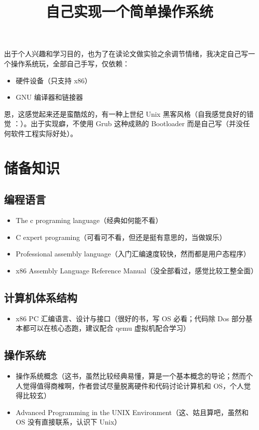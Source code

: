 

\title{自己实现一个简单操作系统}	
\maketitle

出于个人兴趣和学习目的，也为了在读论文做实验之余调节情绪，我决定自己写一个操作系统玩，全部自己手写，仅依赖：
\begin{itemize}
	\item 硬件设备（只支持 x86）
	\item GNU 编译器和链接器
\end{itemize}

恩，这感觉起来还是蛮酷炫的，有一种上世纪 Unix 黑客风格（自我感觉良好的错觉 ：）。出于实现癖，不使用 Grub 这种成熟的 Bootloader 而是自己写（并没任何软件工程实际好处）。

\section{储备知识}

\subsection{编程语言}
\begin{itemize}
	\item The c programing language（经典如何能不看）
	\item C expert programing（可看可不看，但还是挺有意思的，当做娱乐）
	\item Professional assembly language（入门汇编速度较快，然而都是用户态程序）
	\item x86 Assembly Language Reference Manual（没全部看过，感觉比较工整全面）
\end{itemize}

\subsection{计算机体系结构}
\begin{itemize}
	\item x86 PC 汇编语言、设计与接口（很好的书，写 OS 必看；代码除 Dos 部分基本都可以在核心态跑，建议配合 qemu 虚拟机配合学习）
\end{itemize}

\subsection{操作系统}
\begin{itemize}
	\item 操作系统概念（这书，虽然比较经典易懂，算是一个基本概念的导论；然而个人觉得值得商榷啊，作者尝试尽量脱离硬件和代码讨论计算机和 OS，个人觉得比较玄）
	\item Advanced Programming in the UNIX Environment（这、姑且算吧，虽然和 OS 没有直接联系，认识下 Unix）
\end{itemize}

